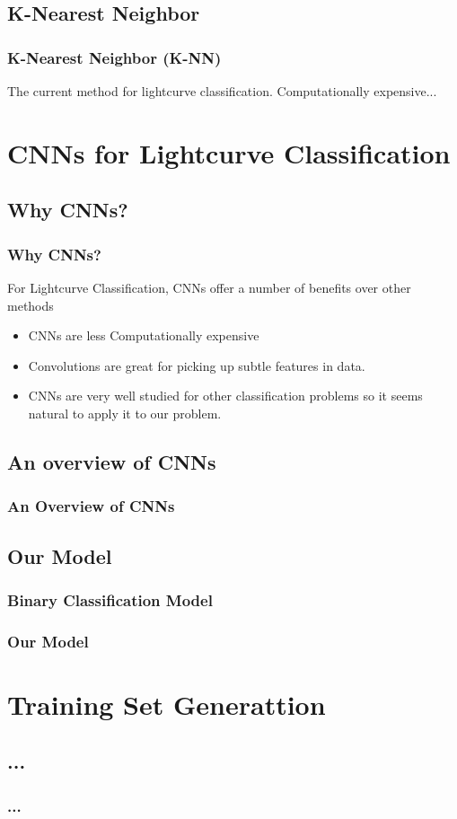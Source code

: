 \documentclass[
	11pt, %
]{beamer}
\begin{document}
\subsection{K-Nearest Neighbor}
\begin{frame}
	\frametitle{K-Nearest Neighbor (K-NN)}
	The current method for lightcurve classification.
	Computationally expensive...
\end{frame}
\section{CNNs for Lightcurve Classification}
\subsection{Why CNNs?}
\begin{frame}
	\frametitle{Why CNNs?}
	For Lightcurve Classification, CNNs offer a number of benefits over other methods
	\begin{itemize}
		\item
			CNNs are less Computationally expensive
		\item
			Convolutions are great for picking up subtle features in data.
		\item
			CNNs are very well studied for other classification problems so it seems natural to apply it to our problem.
	\end{itemize}
\end{frame}
\subsection{An overview of CNNs}
\begin{frame}
	\frametitle{An Overview of CNNs}

\end{frame}
\subsection{Our Model}
\subsubsection{Binary Classification Model}
\begin{frame}
	\frametitle{Our Model}
\end{frame}
\section{Training Set Generattion}
\subsection{...}
\begin{frame}
	\frametitle{...}
\end{frame}
\end{document}
